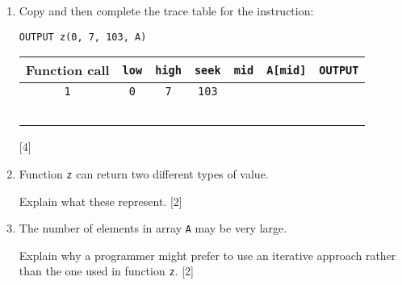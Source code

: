 \begin{enumerate}
\item Copy and then complete the trace table for the instruction: 

\texttt{OUTPUT z(0, 7, 103, A)}
\begin{center}
\begin{tabular}{|c|c|c|c|c|c|c|}
\hline 
Function call & \texttt{\textbf{low}} & \texttt{\textbf{high}} & \texttt{\textbf{seek}} & \texttt{\textbf{mid}} & \texttt{\textbf{A{[}mid{]}}} & \texttt{\textbf{OUTPUT}}\tabularnewline
\hline 
\texttt{1} & \texttt{0} & \texttt{7} & \texttt{103} &  &  & \tabularnewline
\hline 
 &  &  &  &  &  & \tabularnewline
\hline 
 &  &  &  &  &  & \tabularnewline
\hline 
 &  &  &  &  &  & \tabularnewline
\hline 
 &  &  &  &  &  & \tabularnewline
\hline 
 &  &  &  &  &  & \tabularnewline
\hline 
\end{tabular}
\par\end{center}

\hfill{}{[}4{]}
\item Function \texttt{z} can return two different types of value.

Explain what these represent. \hfill{}{[}2{]}
\item The number of elements in array \texttt{A} may be very large. 

Explain why a programmer might prefer to use an iterative approach
rather than the one used in function \texttt{z}. \hfill{} {[}2{]}
\end{enumerate}